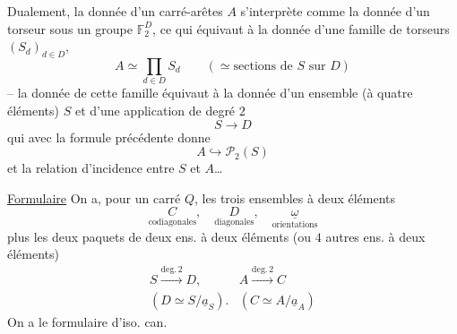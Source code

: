 Dualement,  la donnée d'un carré-arêtes $A$ s'interprète comme la donnée d'un torseur sous un groupe $\mathbb{F}_2^D$, ce qui équivaut à la donnée d'une famille de torseurs $(S_d)_{d\in D}$, 
\[
A\simeq\prod_{d\in D}S_d\qquad(\simeq\text{sections de $S$ sur $D$})
\]
-- la donnée de cette famille équivaut à la donnée d'un ensemble (à quatre éléments) $S$ et d'une application de degré $2$
\[
S\longrightarrow D
\]
qui avec la formule précédente donne
\[
A\hookrightarrow\mathcal{P}_2(S)
\]
et la relation d'incidence entre $S$ et $A$\ldots

\uline{Formulaire} On a, pour un carré $Q$, les trois ensembles à deux éléments
\[
\underset{\text{codiagonales}}{C},\quad
\underset{\text{diagonales}}{D},\quad
\underset{\text{orientations}}{\underline{\omega}}
\]
plus les deux paquets de deux ens. à deux éléments (ou $4$ autres ens. à deux éléments)
\[
\begin{array}{cc}
S\xrightarrow{\mathrm{deg.}\,2}D,&A\xrightarrow{\mathrm{deg.}\,2}C\\
(D\simeq S/\underline{a}_S).&(C\simeq A/\underline{a}_A)
\end{array}
\]
On a le formulaire d'iso. can.
